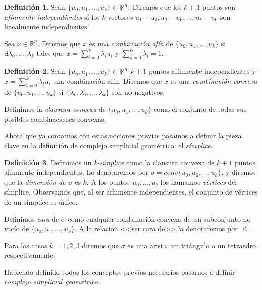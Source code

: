\documentclass[12pt, a4paper, twoside]{book}
\numberwithin{equation}{section}
\theoremstyle{definition}
\newtheorem{defi}{Definición}[section]
\theoremstyle{remark}
\theoremstyle{plain}
\begin{document}
	\begin{defi}
		Sean $\{u_{0},u_{1},...,u_{k}\}\subset\mathbb{R}^{n}$. Diremos
		que los $k+1$ puntos son \textit{afínmente independientes} si 
		los $k$ vectores $u_{1}-u_{0},u_{2}-u_{0},...,u_{k}-u_{0}$ son
		linealmente independientes.

		Sea $x \in \mathbb{R}^{n}$. Diremos que $x$ es una 
		\textit{combinación afín} de $\{u_{0},u_{1},...,u_{k}\}$ si 
		$\exists \lambda_{0},...,\lambda_{k}$ tales que 
		$x=\sum_{i=0}^{k}\lambda_{i}u_{i}$ y 
		$\sum_{i=0}^{k}\lambda_{i}=1$.
	\end{defi}

	\begin{defi}
		Sean $\{u_{0},u_{1},...,u_{k}\}\subset\mathbb{R}^{n}$ $k+1$ 
		puntos afínmente independientes y $x=\sum_{i=0}^{k}
		\lambda_{i}u_{i}$ una combinación afín. Diremos que $x$ es una
		\textit{combinación convexa} de $\{u_{0},u_{1},...,u_{k}\}$ si 
		$\{\lambda_{0},\lambda_{1},...,\lambda_{k}\}$ son 
		no negativos.

		Definimos la \textit{clausura convexa} de $\{u_{0},u_{1},...,
		u_{k}\}$ como el conjunto de todas sus posibles combinaciones 
		convexas.
	\end{defi}

	Ahora que ya contamos con estas nociones previas pasamos a definir la 
	pieza clave en la definición de complejo simplicial geométrico: el 
	\emph{símplice}.

	\begin{defi}
		Definimos un \textit{k-símplice} como la clausura convexa de 
		$k+1$ puntos afínmente independientes. Lo denotaremos por 
		$\sigma=conv\{u_{0},u_{1},\dots,u_{k}\}$, y diremos que la 
		\textit{dimensión de $\sigma$} es $k$. A los puntos $u_{0},
		\dots,u_{k}$ los llamamos \textit{vértices} del símplice. 
		Observamos que, al ser afínmente independientes, el conjunto 
		de vértices de un símplice es único.

		Definimos \textit{cara} de $\sigma$ como cualquier combinación 
		convexa de un subconjunto no vacío de $\{u_{0},u_{1},...,
		u_{k}\}$. A la relación <<ser cara de>> la denotaremos por 
		$\leq$.

		Para los casos $k=1,2,3$ diremos que $\sigma$ es una arista, 
		un triángulo o un tetraedro respectivamente.
	\end{defi}

	Habiendo definido todos los conceptos previos necesarios pasamos a 
	definir \emph{complejo simplicial geométrico}.
\end{document}
